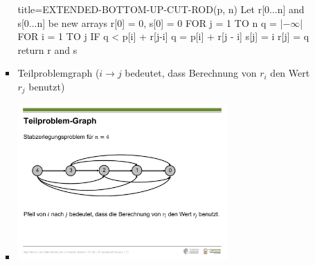 \documentclass[
    12pt,
    a4paper,
    ngerman,
    color=3b,%
    marginpar=false,
    colorback=false,
    leqno,
]{tudaexercise}
\begin{document}
\begin{itemize}
\begin{itemize}
\begin{itemize}
\begin{minipage}{.55\textwidth}
                            \begin{ccode}[autogobble,escapeinside=||]{title={EXTENDED-BOTTOM-UP-CUT-ROD(p, n)}}
                                Let r[0...n] and s[0...n] be  new arrays
                                r[0] = 0, s[0] = 0
                                FOR j = 1 TO n
                                    q = |$-\infty$|
                                    FOR i = 1 TO j
                                        IF q < p[i] + r[j-i]
                                            q = p[i] + r[j - i]
                                            s[j] = i
                                    r[j] = q
                                return r and s
                                \end{ccode}
                            
                        \end{minipage}
                            \item Teilproblemgraph ($i \rightarrow j$ bedeutet, dass Berechnung von $r_i$ den Wert $r_j$ benutzt)
                        \item[] \includegraphics[width=8cm]{pictures/teilproblemgraph.pdf}
                    \end{itemize}
            \end{itemize}


\end{itemize}
\end{document}

